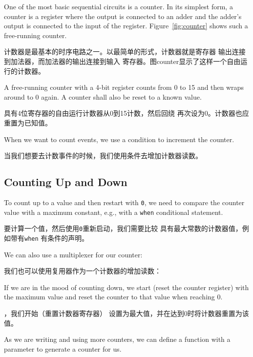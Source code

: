\documentclass[%
    10pt,
    headinclude, footexclude,
    openright, %
    notitlepage,
    cleardoubleempty,
    headsepline,
    pointlessnumbers,
    bibtotoc, idxtotoc,
    ]{scrbook}
\newcommand{\code}[1]{{\small{\texttt{#1}}}}
\begin{document}
One of the most basic sequential circuits is a counter. In its simplest form, a counter is a register
where the output is connected to an adder and the adder's output is connected to the input
of the register. Figure~\ref{fig:counter} shows such a free-running counter.

计数器是最基本的时序电路之一。以最简单的形式，计数器就是寄存器
输出连接到加法器，而加法器的输出连接到输入
寄存器。图counter显示了这样一个自由运行的计数器。

A free-running counter with a 4-bit register counts from 0 to 15 and then wraps around
to 0 again. A counter shall also be reset to a known value.

具有4位寄存器的自由运行计数器从0到15计数，然后回绕
再次设为0。计数器也应重置为已知值。


\noindent When we want to count events, we use a condition to  increment the counter.

\noindent 当我们想要去计数事件的时候，我们使用条件去增加计数器读数。


\subsection{Counting Up and Down}

To count up to a value and then restart with \code{0}, we need to compare
the counter value with a maximum constant, e.g., with a \code{when}
conditional statement.

要计算一个值，然后使用\code{0}重新启动，我们需要比较
具有最大常数的计数器值，例如带有\code{when}
有条件的声明。


\noindent We can also use a multiplexer for our counter:

\noindent 我们也可以使用复用器作为一个计数器的增加读数：


\noindent If we are in the mood of counting down, we start (reset the counter register)
with the maximum value and reset the counter to that value when reaching 0.


，我们开始（重置计数器寄存器）
设置为最大值，并在达到0时将计数器重置为该值。


\noindent As we are writing and using more counters, we can
define a function with a parameter to generate a counter for us.
\end{document}
